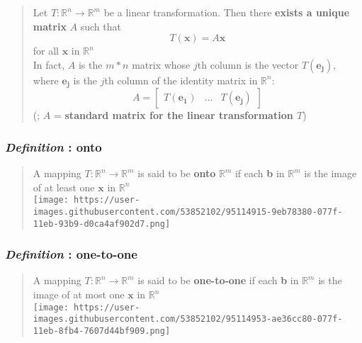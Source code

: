 \documentclass[11pt]{article}
\begin{document}
\begin{quote}
Let \(T : \mathbb{R}^n {\rightarrow} \mathbb{R}^m\) be a linear
transformation. Then there \textbf{exists a unique matrix} \(A\) such
that\\
\[T(\mathbf{x}) = A\mathbf{x}\] for all \(\mathbf{x}\) in
\(\mathbb{R}^n\)\\
In fact, \(A\) is the \(m * n\) matrix whose \(j\)th column is the
vector \(T(\mathbf{e_{j}})\), where \(\mathbf{e_{j}}\) is the \(j\)th
column of the identity matrix in \(\mathbb{R}^n\):\\
\[A = \begin{bmatrix} T(\mathbf{e_{1}}) & \dots & T(\mathbf{e_{j}}) \end{bmatrix}\]
(; \(A\) = \textbf{standard matrix for the linear transformation \(T\)})
\end{quote}

    \hypertarget{definition-onto}{%
\subsubsection{\texorpdfstring{\emph{Definition} :
onto}{Definition : onto}}\label{definition-onto}}

\begin{quote}
A mapping \(T : \mathbb{R}^n {\rightarrow} \mathbb{R}^m\) is said to be
\textbf{onto} \(\mathbb{R}^m\) if each \textbf{b} in \(\mathbb{R}^m\) is
the image of at least one \(\mathbf{x}\) in \(\mathbb{R}^n\)\\
\texttt{[image: https://user-images.githubusercontent.com/53852102/95114915-9eb78380-077f-11eb-93b9-d0ca4af902d7.png]}
\end{quote}

    \hypertarget{definition-one-to-one}{%
\subsubsection{\texorpdfstring{\emph{Definition} :
one-to-one}{Definition : one-to-one}}\label{definition-one-to-one}}

\begin{quote}
A mapping \(T : \mathbb{R}^n {\rightarrow} \mathbb{R}^m\) is said to be
\textbf{one-to-one} if each \textbf{b} in \(\mathbb{R}^m\) is the image
of at most one \(\mathbf{x}\) in \(\mathbb{R}^n\)\\
\texttt{[image: https://user-images.githubusercontent.com/53852102/95114953-ae36cc80-077f-11eb-8fb4-7607d44bf909.png]}
\end{quote}
\end{document}
